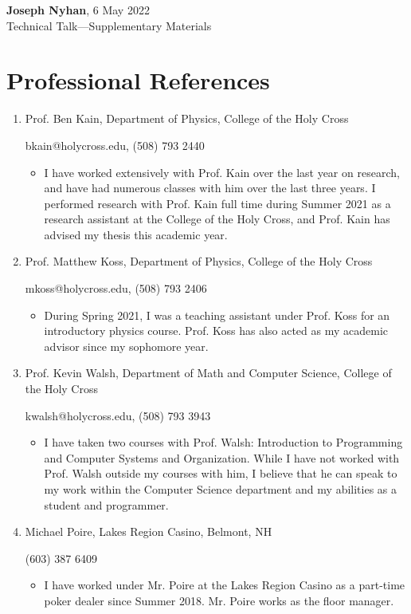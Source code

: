 \documentclass[12pt]{article}
\begin{document}
    \begin{center}
        \textbf{Joseph Nyhan}, 6 May 2022\\
        Technical Talk---Supplementary Materials
    \end{center}

    \section*{Professional References}

    \begin{enumerate}
        \item Prof. Ben Kain, Department of Physics, College of the Holy Cross 
        
        bkain@holycross.edu, (508) 793 2440
        \begin{itemize}
            \item[] I have worked extensively with Prof. Kain over the last year on research, and have had numerous classes with him over the last three years. I performed research with Prof. Kain full time during Summer 2021 as a research assistant at the College of the Holy Cross, and Prof. Kain has advised my thesis this academic year.
        \end{itemize}

        \item Prof. Matthew Koss, Department of Physics, College of the Holy Cross 
        
        mkoss@holycross.edu, (508) 793 2406
        \begin{itemize}
            \item[] During Spring 2021, I was a teaching assistant under Prof. Koss for an introductory physics course. Prof. Koss has also acted as my academic advisor since my sophomore year.
        \end{itemize}

        \item Prof. Kevin Walsh, Department of Math and Computer Science, College of the Holy Cross

        kwalsh@holycross.edu, (508) 793 3943
        \begin{itemize}
            \item[] I have taken two courses with Prof. Walsh: Introduction to Programming and Computer Systems and Organization. While I have not worked with Prof. Walsh outside my courses with him, I believe that he can speak to my work within the Computer Science department and my abilities as a student and programmer.
        \end{itemize}

        \item Michael Poire, Lakes Region Casino, Belmont, NH

        (603) 387 6409
        \begin{itemize}
            \item[] I have worked under Mr. Poire at the Lakes Region Casino as a part-time poker dealer since Summer 2018. Mr. Poire works as the floor manager.
        \end{itemize}


    \end{enumerate}
\end{document}
